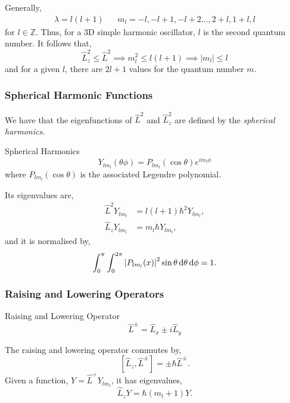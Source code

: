 \documentclass{book}
\begin{document}
Generally,
\begin{align}
	\lambda = l(l+1) && m_l = -l, -l+1, -l + 2 \ldots, 2 + l, 1 + l, l
\end{align}
for $l \in \mathbb{Z}$. Thus, for a 3D simple harmonic oscillator, $l$ is the second quantum number. It follows that,
\begin{equation}
	\hat{L}_z^2 \leq \hat{L}^2 \implies m_l^2 \leq l(l+1) \implies |m_l| \leq l
\end{equation}
and for a given $l$, there are $2l + 1$ values for the quantum number $m$.
\subsubsection{Spherical Harmonic Functions}
We have that the eigenfunctions of $\hat{L}^2$ and $\hat{L}_z^2$ are defined by the \textit{spherical harmonics}.
\begin{Definitions}{Spherical Harmonics}{}
	\begin{equation}
		Y_{lm_l}(\theta\phi) = P_{lm_l}(\cos\theta) e^{im_l\phi}
	\end{equation}
	where $P_{lm_l}(\cos\theta)$ is the associated Legendre polynomial.
\end{Definitions}
 Its eigenvalues are,
\begin{align}
	\hat{L}^2Y_{lm_l} & = l(l+1)\hbar^2 Y_{lm_l}, \\
	\hat{L}_z Y_{lm_l} & = m_l\hbar Y_{lm_l},
\end{align}
and it is normalised by,
\begin{equation}
	\int_0^{\pi}\int_{0}^{2\pi}\abs{P_{lm_l}(x)}^2 \sin\theta\dd{\theta}\dd{\phi} = 1.
\end{equation}
\subsubsection{Raising and Lowering Operators}
\begin{Definitions}{Raising and Lowering Operator}{}
	\begin{equation}
		\hat{L}^{\pm} = \hat{L}_x \pm i \hat{L}_y
	\end{equation}
\end{Definitions}
The raising and lowering operator commutes by,
\begin{equation}
	\left[\hat{L}_z, \hat{L}^{\pm}\right] = \pm \hbar \hat{L}^{\pm}.
\end{equation}
Given a function, $Y = \hat{L}^+Y_{lm_l}$, it has eigenvalues,
\begin{equation}
	\hat{L}_zY = \hbar(m_l+1)Y.
\end{equation}
\end{document}
